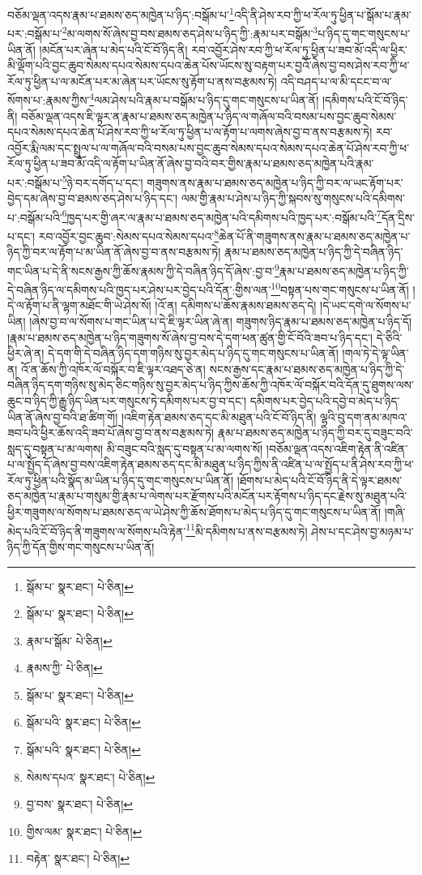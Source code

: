 བཅོམ་ལྡན་འདས་རྣམ་པ་ཐམས་ཅད་མཁྱེན་པ་ཉིད་:བསྒོམ་པ་\footnote{སྒོམ་པ་  སྣར་ཐང་།  པེ་ཅིན། }འདི་ནི་ཤེས་རབ་ཀྱི་ཕ་རོལ་ཏུ་ཕྱིན་པ་སྒོམ་པ་རྣམ་པར་:བསྒོམ་པ་\footnote{སྒོམ་པ་  སྣར་ཐང་།  པེ་ཅིན། }མ་ལགས་སོ་ཞེས་བྱ་བས་ཐམས་ཅད་ཤེས་པ་ཉིད་ཀྱི་:རྣམ་པར་བསྒོམ་\footnote{རྣམ་པ་སྒོམ་  པེ་ཅིན། }པ་ཉིད་དུ་གང་གསུངས་པ་ཡིན་ནོ། །མངོན་པར་ཞེན་པ་མེད་པའི་ངོ་བོ་ཉིད་ནི། རབ་འབྱོར་ཤེས་རབ་ཀྱི་ཕ་རོལ་ཏུ་ཕྱིན་པ་ཟབ་མོ་འདི་ལ་ཕྱིར་མི་ལྡོག་པའི་བྱང་ཆུབ་སེམས་དཔའ་སེམས་དཔའ་ཆེན་པོས་ཡོངས་སུ་བརྟག་པར་བྱའོ་ཞེས་བྱ་བས་ཤེས་རབ་ཀྱི་ཕ་རོལ་ཏུ་ཕྱིན་པ་ལ་མངོན་པར་མ་ཞེན་པར་ཡོངས་སུ་རྟོག་པ་ནས་བརྩམས་ཏེ། འདི་བཤད་པ་ལ་མི་དངང་བ་ལ་སོགས་པ་:རྣམས་ཀྱིས་\footnote{རྣམས་ཀྱི་  པེ་ཅིན། }ལམ་ཤེས་པའི་རྣམ་པ་བསྒོམ་པ་ཉིད་དུ་གང་གསུངས་པ་ཡིན་ནོ། །དམིགས་པའི་ངོ་བོ་ཉིད་ནི། བཅོམ་ལྡན་འདས་ཇི་ལྟར་ན་རྣམ་པ་ཐམས་ཅད་མཁྱེན་པ་ཉིད་ལ་གཞོལ་བའི་བསམ་པས་བྱང་ཆུབ་སེམས་དཔའ་སེམས་དཔའ་ཆེན་པོ་ཤེས་རབ་ཀྱི་ཕ་རོལ་ཏུ་ཕྱིན་པ་ལ་རྟོག་པ་ལགས་ཞེས་བྱ་བ་ནས་བརྩམས་ཏེ། རབ་འབྱོར་རྨི་ལམ་དང་སྤྲུལ་པ་ལ་གཞོལ་བའི་བསམ་པས་བྱང་ཆུབ་སེམས་དཔའ་སེམས་དཔའ་ཆེན་པོ་ཤེས་རབ་ཀྱི་ཕ་རོལ་ཏུ་ཕྱིན་པ་ཟབ་མོ་འདི་ལ་རྟོག་པ་ཡིན་ནོ་ཞེས་བྱ་བའི་བར་གྱིས་རྣམ་པ་ཐམས་ཅད་མཁྱེན་པའི་རྣམ་པར་:བསྒོམ་པ་\footnote{སྒོམ་པ་  སྣར་ཐང་།  པེ་ཅིན། }ཉེ་བར་དགོད་པ་དང་། གཟུགས་ནས་རྣམ་པ་ཐམས་ཅད་མཁྱེན་པ་ཉིད་ཀྱི་བར་ལ་ཡང་རྟོག་པར་བྱེད་དམ་ཞེས་བྱ་བ་ཐམས་ཅད་ཤེས་པ་ཉིད་དང་། ལམ་གྱི་རྣམ་པ་ཤེས་པ་ཉིད་ཀྱི་སྐབས་སུ་གསུངས་པའི་དམིགས་པ་:བསྒོམ་པའི་\footnote{སྒོམ་པའི་  སྣར་ཐང་།  པེ་ཅིན། }ཁྱད་པར་གྱི་ཞར་ལ་རྣམ་པ་ཐམས་ཅད་མཁྱེན་པའི་དམིགས་པའི་ཁྱད་པར་:བསྒོམ་པའི་\footnote{སྒོམ་པའི་  སྣར་ཐང་།  པེ་ཅིན། }དོན་དྲིས་པ་དང་། རབ་འབྱོར་བྱང་ཆུབ་:སེམས་དཔའ་སེམས་དཔའ་\footnote{སེམས་དཔའ་  སྣར་ཐང་།  པེ་ཅིན། }ཆེན་པོ་ནི་གཟུགས་ནས་རྣམ་པ་ཐམས་ཅད་མཁྱེན་པ་ཉིད་ཀྱི་བར་ལ་རྟོག་པ་མ་ཡིན་ནོ་ཞེས་བྱ་བ་ནས་བརྩམས་ཏེ། རྣམ་པ་ཐམས་ཅད་མཁྱེན་པ་ཉིད་ཀྱི་དེ་བཞིན་ཉིད་གང་ཡིན་པ་དེ་ནི་སངས་རྒྱས་ཀྱི་ཆོས་རྣམས་ཀྱི་དེ་བཞིན་ཉིད་དོ་ཞེས་:བྱ་བ་\footnote{བྱ་བས་  སྣར་ཐང་།  པེ་ཅིན། }རྣམ་པ་ཐམས་ཅད་མཁྱེན་པ་ཉིད་ཀྱི་དེ་བཞིན་ཉིད་ལ་དམིགས་པའི་ཁྱད་པར་ཤེས་པར་བྱེད་པའི་དོན་:གྱིས་ལན་\footnote{གྱིས་ལམ་  སྣར་ཐང་།  པེ་ཅིན། }བསྟན་པས་གང་གསུངས་པ་ཡིན་ནོ། །དེ་ལ་རྟོག་པ་ནི་ལྷག་མཐོང་གི་ཡེ་ཤེས་སོ། །འོ་ན། དམིགས་པ་ཆོས་རྣམས་ཐམས་ཅད་དེ། །དེ་ཡང་དགེ་ལ་སོགས་པ་ཡིན། །ཞེས་བྱ་བ་ལ་སོགས་པ་གང་ཡིན་པ་དེ་ཇི་ལྟར་ཡིན་ཞེ་ན། གཟུགས་ཉིད་རྣམ་པ་ཐམས་ཅད་མཁྱེན་པ་ཉིད་དོ། །རྣམ་པ་ཐམས་ཅད་མཁྱེན་པ་ཉིད་གཟུགས་སོ་ཞེས་བྱ་བས་དེ་དག་ཕན་ཚུན་གྱི་ངོ་བོའི་ཟབ་པ་ཉིད་དང་། དེ་ཅིའི་ཕྱིར་ཞེ་ན། དེ་དག་གི་དེ་བཞིན་ཉིད་དག་གཉིས་སུ་བྱར་མེད་པ་ཉིད་དུ་གང་གསུངས་པ་ཡིན་ནོ། །གལ་ཏེ་དེ་ལྟ་ཡིན་ན། འོ་ན་ཆོས་ཀྱི་འཁོར་ལོ་བསྐོར་བ་ཇི་ལྟར་འཐད་ཅེ་ན། སངས་རྒྱས་དང་རྣམ་པ་ཐམས་ཅད་མཁྱེན་པ་ཉིད་ཀྱི་དེ་བཞིན་ཉིད་དག་གཉིས་སུ་མེད་ཅིང་གཉིས་སུ་བྱར་མེད་པ་ཉིད་ཀྱིས་ཆོས་ཀྱི་འཁོར་ལོ་བསྐོར་བའི་དོན་དུ་ཐུགས་ལས་ཆུང་བ་ཉིད་ཀྱི་རྒྱུ་ཉིད་ཡིན་པར་གསུངས་ཏེ་དམིགས་པར་བྱ་བ་དང་། དམིགས་པར་བྱེད་པའི་དབྱེ་བ་མེད་པ་ཉིད་ཡིན་ནོ་ཞེས་བྱ་བའི་ཐ་ཚིག་གོ། །འཇིག་རྟེན་ཐམས་ཅད་དང་མི་མཐུན་པའི་ངོ་བོ་ཉིད་ནི། ལྷའི་བུ་དག་ནམ་མཁའ་ཟབ་པའི་ཕྱིར་ཆོས་འདི་ཟབ་པོ་ཞེས་བྱ་བ་ནས་བརྩམས་ཏེ། རྣམ་པ་ཐམས་ཅད་མཁྱེན་པ་ཉིད་ཀྱི་བར་དུ་བཟུང་བའི་སླད་དུ་བསྟན་པ་མ་ལགས། མི་བཟུང་བའི་སླད་དུ་བསྟན་པ་མ་ལགས་སོ། །བཅོམ་ལྡན་འདས་འཇིག་རྟེན་ནི་འཛིན་པ་ལ་སྤྱོད་དོ་ཞེས་བྱ་བས་འཇིག་རྟེན་ཐམས་ཅད་དང་མི་མཐུན་པ་ཉིད་ཀྱིས་ནི་འཛིན་པ་ལ་སྤྱོད་པ་ནི་ཤེས་རབ་ཀྱི་ཕ་རོལ་ཏུ་ཕྱིན་པའི་སྣོད་མ་ཡིན་པ་ཉིད་དུ་གང་གསུངས་པ་ཡིན་ནོ། །ཐོགས་པ་མེད་པའི་ངོ་བོ་ཉིད་ནི་དེ་ལྟར་ཐམས་ཅད་མཁྱེན་པ་རྣམ་པ་གསུམ་གྱི་རྣམ་པ་ལེགས་པར་རྫོགས་པའི་མངོན་པར་རྟོགས་པ་ཉིད་དང་རྗེས་སུ་མཐུན་པའི་ཕྱིར་གཟུགས་ལ་སོགས་པ་ཐམས་ཅད་ལ་ཡེ་ཤེས་ཀྱི་ཆོས་ཐོགས་པ་མེད་པ་ཉིད་དུ་གང་གསུངས་པ་ཡིན་ནོ། །གཞི་མེད་པའི་ངོ་བོ་ཉིད་ནི་གཟུགས་ལ་སོགས་པའི་རྟེན་\footnote{བརྟེན་  སྣར་ཐང་།  པེ་ཅིན། }མི་དམིགས་པ་ནས་བརྩམས་ཏེ། ཤེས་པ་དང་ཤེས་བྱ་མཉམ་པ་ཉིད་ཀྱི་དོན་གྱིས་གང་གསུངས་པ་ཡིན་ནོ། 